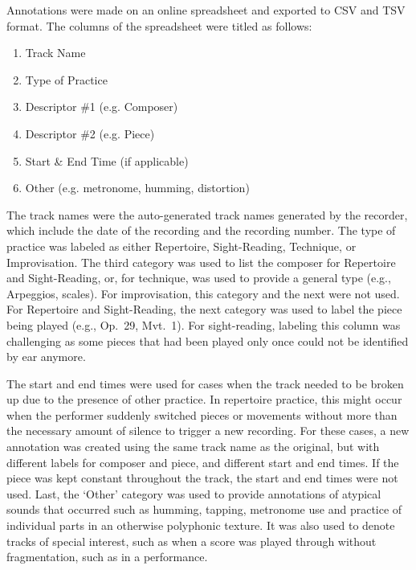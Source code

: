 \documentclass{article}
\begin{document}
Annotations were made on an online spreadsheet and exported to CSV and TSV format. The columns of the spreadsheet were titled as follows:
\begin{enumerate}
\item Track Name
\item Type of Practice
\item Descriptor \#1 (e.g. Composer)
\item Descriptor \#2 (e.g. Piece)
\item Start \& End Time (if applicable)
\item Other (e.g. metronome, humming, distortion)
\end{enumerate}

The track names were the auto-generated track names generated by the recorder, which include the date of the recording and the recording number. 
The type of practice was labeled as either Repertoire, Sight-Reading, Technique, or Improvisation. 
The third category was used to list the composer for Repertoire and Sight-Reading, or, for technique, was used to provide a general type (e.g., Arpeggios, scales). 
For improvisation, this category and the next were not used. 
For Repertoire and Sight-Reading, the next category was used to label the piece being played (e.g., Op.~29, Mvt.~1). 
For sight-reading, labeling this column was challenging as some pieces that had been played only once could not be identified by ear anymore. 

The start and end times were used for cases when the track needed to be broken up due to the presence of other practice. 
In repertoire practice, this might occur when the performer suddenly switched pieces or movements without more than the necessary amount of silence to trigger a new recording. 
For these cases, a new annotation was created using the same track name as the original, but with different labels for composer and piece, and different start and end times. 
If the piece was kept constant throughout the track, the start and end times were not used. Last, the `Other' category was used to provide annotations of atypical sounds that occurred such as humming, tapping, metronome use and practice of individual parts in an otherwise polyphonic texture. 
It was also used to denote tracks of special interest, such as when a score was played through without fragmentation, such as in a performance.
\end{document}
